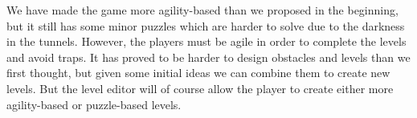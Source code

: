 	We have made the game more agility-based than we proposed in the beginning, but it still has some minor puzzles which are harder to solve due to the darkness in the tunnels. However, the players must be agile in order to complete the levels and avoid traps. It has proved to be harder to design obstacles and levels than we first thought, but given some initial ideas we can combine them to create new levels. But the level editor will of course allow the player to create either more agility-based or puzzle-based levels.
